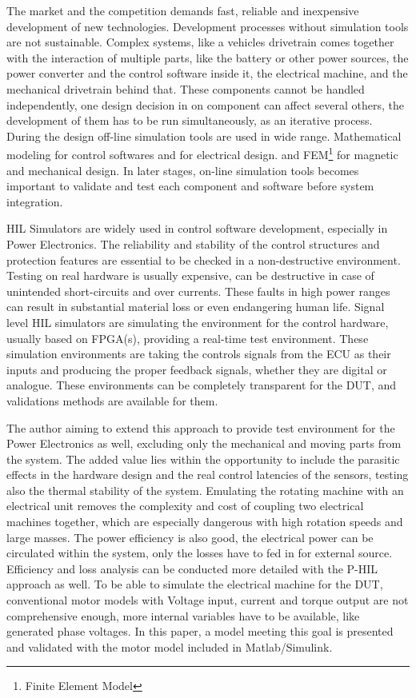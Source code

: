 \documentclass[twoside,b5paper,10pt]{article}
\begin{document}
The market and the competition demands fast, reliable and inexpensive development of new technologies. Development processes without simulation tools are not sustainable. Complex systems, like a vehicles drivetrain comes together with the interaction of multiple parts, like the battery or other power sources, the power converter and the control software inside it, the electrical machine, and the mechanical drivetrain behind that. These components cannot be handled independently, one design decision in on component can affect several others, the development of them has to be run simultaneously, as an iterative process. During the design off-line simulation tools are used in wide range. Mathematical modeling for control softwares and for electrical design. and FEM\footnote{Finite Element Model} for magnetic and mechanical design. In later stages, on-line simulation tools becomes important to validate and test each component and software before system integration.

HIL Simulators are widely used in control software development, especially in Power Electronics. The reliability and stability of the control structures and protection features are essential to be checked in a non-destructive environment. Testing on real hardware is usually expensive, can be destructive in case of unintended short-circuits and over currents. These faults in high power ranges can result in substantial material loss or even endangering human life. Signal level HIL simulators are simulating the environment for the control hardware, usually based on FPGA(s), providing a real-time test environment. These simulation environments are taking the controls signals from the ECU as their inputs and producing the proper feedback signals, whether they are digital or analogue. These environments can be completely transparent for the DUT, and validations methods are available for them.

The author aiming to extend this approach to provide test environment for the Power Electronics as well, excluding only the mechanical and moving parts from the system. The added value lies within the opportunity to include the parasitic effects in the hardware design and the real control latencies of the sensors, testing also the thermal stability of the system. Emulating the rotating machine with an electrical unit removes the complexity and cost of coupling two electrical machines together, which are especially dangerous with high rotation speeds and large masses. The power efficiency is also good, the electrical power can be circulated within the system, only the losses have to fed in for external source. Efficiency and loss analysis can be conducted more detailed with the P-HIL approach as well. To be able to simulate the electrical machine for the DUT, conventional motor models with Voltage input, current and torque output are not comprehensive enough, more internal variables have to be available, like generated phase voltages. In this paper, a model meeting this goal is presented and validated with the motor model included in Matlab/Simulink.
\end{document}
